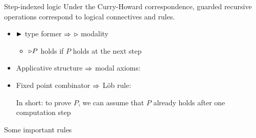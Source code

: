 \documentclass{beamer}
\begin{document}
\begin{frame}{Step-indexed logic}
Under the Curry-Howard correspondence, guarded recursive operations correspond to logical connectives and rules.
\begin{itemize}
    \item<2-> $\Later$ type former $\To$ $\later$ modality
    \begin{itemize}
        \item $\later{P}$ holds if $P$ holds at the next step
    \end{itemize}
    \item<3-> Applicative structure $\To$ modal axioms:
    \item<4-> Fixed point combinator $\To$ Löb rule:
    \begin{mathpar}
    \end{mathpar}
    In short: to prove $P$, we can assume that $P$ already holds after one computation step
\end{itemize}
\end{frame}

\begin{frame}{Some important rules}
\end{frame}
\end{document}
